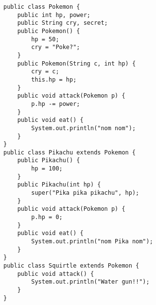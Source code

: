 \begin{lstlisting}
public class Pokemon {
    public int hp, power;
    public String cry, secret;
    public Pokemon() {
        hp = 50;
        cry = "Poke?";
    }
    public Pokemon(String c, int hp) {
        cry = c;
        this.hp = hp;
    }
    public void attack(Pokemon p) {
        p.hp -= power;
    }
    public void eat() {
        System.out.println("nom nom");
    }
}
public class Pikachu extends Pokemon {
    public Pikachu() {
        hp = 100;
    }
    public Pikachu(int hp) {
        super("Pika pika pikachu", hp);
    }
    public void attack(Pokemon p) {
        p.hp = 0;
    }
    public void eat() {
        System.out.println("nom Pika nom");
    }
}
public class Squirtle extends Pokemon {
    public void attack() {
        System.out.println("Water gun!!");
    }
}
\end{lstlisting}
